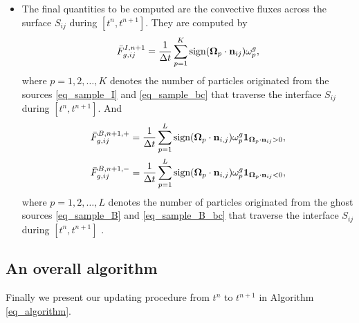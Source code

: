 \documentclass[preprint,12pt]{elsarticle}
\theoremstyle{definition}
\theoremstyle{plain}
\numberwithin{equation}{section}
\numberwithin{algorithm}{section}
\newcounter{eq_count}
\newcounter{thm_count}
\newcounter{alg_count}
\newcommand{\vOmega}{\mathbf{\Omega}}
\begin{document}
\begin{itemize}
\item  The final quantities to be computed are the convective fluxes across the surface $S_{ij} $ during  $[t^n,t^{n+1}]$. They are computed by
\begin{equation} \label{eq_def_fluxA}
    \Bar{F}_{g,ij}^{I,n+1} = \frac{1}{\Delta t} \sum_{p=1}^K \text{sign}(\vOmega_p \cdot \mathbf{n}_{ij})\omega_p^g,
 \end{equation}
 where $p= 1,2,\ldots,K$  denotes the number of particles originated from the sources \eqref{eq_sample_I} and \eqref{eq_sample_bc} that traverse the  interface $S_{ij}$ during $[t^n,t^{n+1}]$. And
 \begin{equation}\label{eq_def_fluxB}
     \begin{aligned}
        &\Bar{F}_{g,ij}^{B,n+1,+} = \frac{1}{\Delta t} \sum_{p=1}^{L} \text{sign}(\vOmega_p \cdot \mathbf{n}_{i,j})\omega_p^g \mathbf{1}_{\vOmega_p \cdot \mathbf{n}_{ij}>0},
        \\
        &\Bar{F}_{g,ij}^{B,n+1,-} = \frac{1}{\Delta t} \sum_{p=1}^{L} \text{sign}(\vOmega_p \cdot \mathbf{n}_{i,j})\omega_p^g \mathbf{1}_{\vOmega_p \cdot \mathbf{n}_{ij}<0},
     \end{aligned}
 \end{equation}
  where $p= 1,2,\ldots,L$  denotes the number of particles originated from the ghost sources \eqref{eq_sample_B} and \eqref{eq_sample_B_bc} that traverse the interface $S_{ij}$ during $[t^n,t^{n+1}]$ . 
\end{itemize}

\subsection{An overall algorithm}
Finally we present our updating procedure from $t^n$ to $t^{n+1}$ in Algorithm \eqref{eq_algorithm}.
\end{document}
